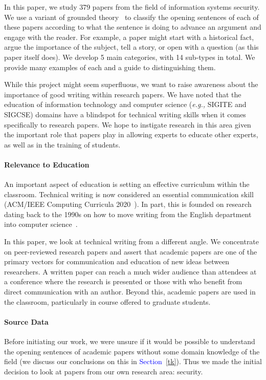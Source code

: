 \documentclass[sigconf,anonymous]{acmart}
\newcommand{\eg}{\textit{e.g.,}\xspace}
\newcommand{\textblue}[1]{\textcolor{blue}{#1}}
\begin{document}
In this paper, we study 379 papers from the field of information systems security. We use a variant of grounded theory~\cite{glaser1968discovery} to classify the opening sentences of each of these papers according to what the sentence is doing to advance an argument and engage with the reader. For example, a paper might start with a historical fact, argue the importance of the subject, tell a story, or open with a question (as this paper itself does). We develop 5 main categories, with 14 sub-types in total. We provide many examples of each and a guide to distinguishing them.

While this project might seem superfluous, we want to raise awareness about the importance of good writing within research papers. We have noted that the education of information technology and computer science (\eg SIGITE and SIGCSE) domains have a blindspot for technical writing skills when it comes specifically to research papers. We hope to instigate research in this area given the important role that papers play in allowing experts to educate other experts, as well as in the training of students.
	
\paragraph{Relevance to Education}

An important aspect of education is setting an effective curriculum within the classroom. Technical writing is now considered an essential communication skill (ACM/IEEE Computing Curricula 2020~\cite{CC2020,CC2020report}). In part, this is founded on research dating back to the 1990s on how to move writing from the English department into computer science~\cite{Pes91,TP93,FPC96,Kay98}.

In this paper, we look at technical writing from a different angle. We concentrate on peer-reviewed research papers and assert that academic papers are one of the primary vectors for communication and education of new ideas between researchers. A written paper can reach a much wider audience than attendees at a conference where the research is presented or those with who benefit from direct communication with an author. Beyond this, academic papers are used in the classroom, particularly in course offered to graduate students. 
	
\paragraph{Source Data} Before initiating our work, we were unsure if it would be possible to understand the opening sentences of academic papers without some domain knowledge of the field (we discuss our conclusions on this in \textblue{Section~\ref{tk}}). Thus we made the initial decision to look at papers from our own research area: security. 
\end{document}
